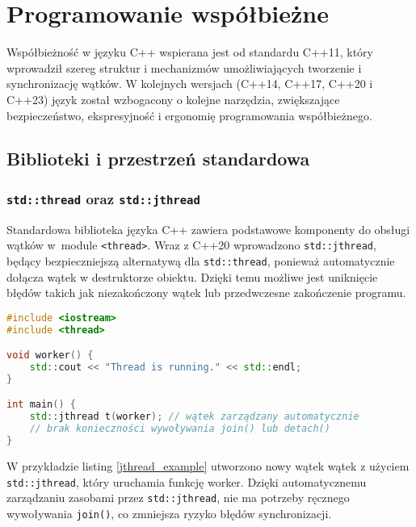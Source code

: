 \section{Programowanie współbieżne}
Współbieżność w języku C++ wspierana jest od standardu C++11, który wprowadził szereg struktur i mechanizmów umożliwiających tworzenie i synchronizację wątków. W kolejnych wersjach (C++14, C++17, C++20 i C++23) język został wzbogacony o kolejne narzędzia, zwiększające bezpieczeństwo, ekspresyjność i ergonomię programowania współbieżnego.

\subsection{Biblioteki i przestrzeń standardowa}
\subsubsection{\texttt{std::thread} oraz \texttt{std::jthread}}
Standardowa biblioteka języka C++ zawiera podstawowe komponenty do obsługi wątków w~module \texttt{<thread>}. Wraz z C++20 wprowadzono \texttt{std::jthread}, będący bezpieczniejszą alternatywą dla \texttt{std::thread}, ponieważ automatycznie dołącza wątek w destruktorze obiektu. Dzięki temu możliwe jest uniknięcie błędów takich jak niezakończony wątek   lub przedwczesne zakończenie programu.

\begin{lstlisting}[language=C++, caption={Przykład użycia std::jthread}, label={jthread_example}]
#include <iostream>
#include <thread>

void worker() {
    std::cout << "Thread is running." << std::endl;
}

int main() {
    std::jthread t(worker); // wątek zarządzany automatycznie
    // brak konieczności wywoływania join() lub detach()
}
\end{lstlisting}    
W przykładzie listing \ref{jthread_example} utworzono nowy wątek wątek z użyciem \texttt{std::jthread}, który uruchamia funkcję worker. Dzięki automatycznemu zarządzaniu zasobami przez \texttt{std::jthread}, nie ma potrzeby ręcznego wywoływania \texttt{join()}, co zmniejsza ryzyko błędów synchronizacji.


